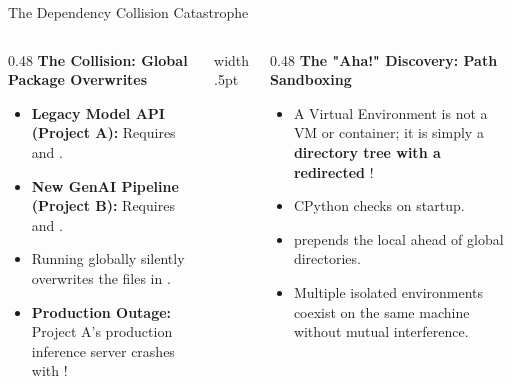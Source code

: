 \documentclass[../m00-session-04.tex]{subfiles}
\begin{document}
\begin{frame}[fragile]{The Dependency Collision Catastrophe}
  \begin{columns}[T,onlytextwidth]
    \begin{column}{0.48\textwidth}
      {\small\bfseries\color{UpGradRed}The Collision: Global Package Overwrites}\par\vspace{0.08cm}
      \begin{itemize}\setlength{\itemsep}{0.20em}\small
        \item \textbf{Legacy Model API (Project A):} Requires  and .
        \item \textbf{New GenAI Pipeline (Project B):} Requires  and .
        \item Running  globally silently overwrites the files in .
        \item \textcolor{UpGradRed}{\textbf{Production Outage:}} Project A's production inference server crashes with !
      \end{itemize}
    \end{column}
    \hfill{\color{UpGradRule}\vrule width .5pt}\hfill
    \begin{column}{0.48\textwidth}
      {\small\bfseries\color{AWSEmerald}The "Aha!" Discovery: Path Sandboxing}\par\vspace{0.08cm}
      \begin{itemize}\setlength{\itemsep}{0.18em}\small
        \item A Virtual Environment is not a VM or container; it is simply a \textbf{directory tree with a redirected }!
        \item CPython checks  on startup.
        \item {} prepends the local  ahead of global directories.
        \item Multiple isolated environments coexist on the same machine without mutual interference.
      \end{itemize}
      \vspace{0.04cm}
    \end{column}
  \end{columns}
\end{frame}
\end{document}
